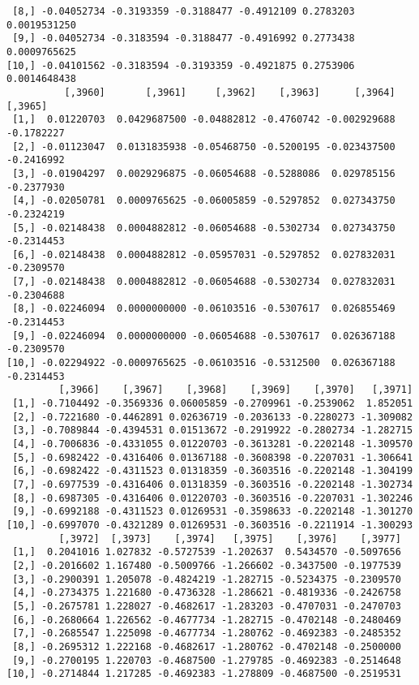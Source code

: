 \documentclass[
  letterpaper,
  DIV=11,
  numbers=noendperiod]{scrreprt}
\begin{document}
\begin{verbatim}
 [8,] -0.04052734 -0.3193359 -0.3188477 -0.4912109 0.2783203  0.0019531250
 [9,] -0.04052734 -0.3183594 -0.3188477 -0.4916992 0.2773438  0.0009765625
[10,] -0.04101562 -0.3183594 -0.3193359 -0.4921875 0.2753906  0.0014648438
          [,3960]       [,3961]     [,3962]    [,3963]      [,3964]    [,3965]
 [1,]  0.01220703  0.0429687500 -0.04882812 -0.4760742 -0.002929688 -0.1782227
 [2,] -0.01123047  0.0131835938 -0.05468750 -0.5200195 -0.023437500 -0.2416992
 [3,] -0.01904297  0.0029296875 -0.06054688 -0.5288086  0.029785156 -0.2377930
 [4,] -0.02050781  0.0009765625 -0.06005859 -0.5297852  0.027343750 -0.2324219
 [5,] -0.02148438  0.0004882812 -0.06054688 -0.5302734  0.027343750 -0.2314453
 [6,] -0.02148438  0.0004882812 -0.05957031 -0.5297852  0.027832031 -0.2309570
 [7,] -0.02148438  0.0004882812 -0.06054688 -0.5302734  0.027832031 -0.2304688
 [8,] -0.02246094  0.0000000000 -0.06103516 -0.5307617  0.026855469 -0.2314453
 [9,] -0.02246094  0.0000000000 -0.06054688 -0.5307617  0.026367188 -0.2309570
[10,] -0.02294922 -0.0009765625 -0.06103516 -0.5312500  0.026367188 -0.2314453
         [,3966]    [,3967]    [,3968]    [,3969]    [,3970]   [,3971]
 [1,] -0.7104492 -0.3569336 0.06005859 -0.2709961 -0.2539062  1.852051
 [2,] -0.7221680 -0.4462891 0.02636719 -0.2036133 -0.2280273 -1.309082
 [3,] -0.7089844 -0.4394531 0.01513672 -0.2919922 -0.2802734 -1.282715
 [4,] -0.7006836 -0.4331055 0.01220703 -0.3613281 -0.2202148 -1.309570
 [5,] -0.6982422 -0.4316406 0.01367188 -0.3608398 -0.2207031 -1.306641
 [6,] -0.6982422 -0.4311523 0.01318359 -0.3603516 -0.2202148 -1.304199
 [7,] -0.6977539 -0.4316406 0.01318359 -0.3603516 -0.2202148 -1.302734
 [8,] -0.6987305 -0.4316406 0.01220703 -0.3603516 -0.2207031 -1.302246
 [9,] -0.6992188 -0.4311523 0.01269531 -0.3598633 -0.2202148 -1.301270
[10,] -0.6997070 -0.4321289 0.01269531 -0.3603516 -0.2211914 -1.300293
         [,3972]  [,3973]    [,3974]   [,3975]    [,3976]    [,3977]
 [1,]  0.2041016 1.027832 -0.5727539 -1.202637  0.5434570 -0.5097656
 [2,] -0.2016602 1.167480 -0.5009766 -1.266602 -0.3437500 -0.1977539
 [3,] -0.2900391 1.205078 -0.4824219 -1.282715 -0.5234375 -0.2309570
 [4,] -0.2734375 1.221680 -0.4736328 -1.286621 -0.4819336 -0.2426758
 [5,] -0.2675781 1.228027 -0.4682617 -1.283203 -0.4707031 -0.2470703
 [6,] -0.2680664 1.226562 -0.4677734 -1.282715 -0.4702148 -0.2480469
 [7,] -0.2685547 1.225098 -0.4677734 -1.280762 -0.4692383 -0.2485352
 [8,] -0.2695312 1.222168 -0.4682617 -1.280762 -0.4702148 -0.2500000
 [9,] -0.2700195 1.220703 -0.4687500 -1.279785 -0.4692383 -0.2514648
[10,] -0.2714844 1.217285 -0.4692383 -1.278809 -0.4687500 -0.2519531

\end{verbatim}
\end{document}
